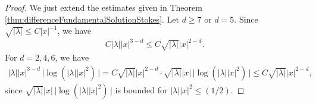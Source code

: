 \begin{proof}
  We just extend the estimates given in Theorem \ref{thm:differenceFundamentalSolutionStokes}.
  Let $d \geq 7$ or $d = 5$. Since $\sqrt{|\lambda|} \leq C{|x|}^{-1}$, we have
  \begin{align*}
    C |\lambda| |x|^{3 - d} \leq C \sqrt{|\lambda|} |x|^{2 - d}.
  \end{align*}
  For $d = 2,4,6$, we have
  \begin{align*}
    |\lambda| |x|^{3 - d} \, \big| \log(|\lambda||x|^2)\,\big|
    = C \sqrt{|\lambda|} |x|^{2 - d} \cdot \sqrt{|\lambda|} |x|\, \big| \log(|\lambda| |x|^2)\, \big|
    \leq C \sqrt{|\lambda|} |x|^{2 - d},
  \end{align*}
  since $\sqrt{|\lambda|} |x| \,\big|\log(|\lambda| |x|^2)\,\big|$ is bounded for $|\lambda| |x|^2 \leq ({1}/{2})$.
\end{proof}

